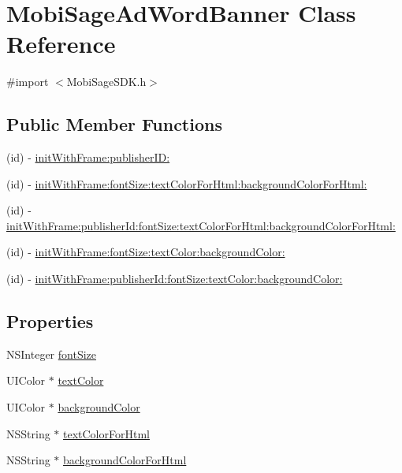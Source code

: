 \hypertarget{interface_mobi_sage_ad_word_banner}{\section{\-Mobi\-Sage\-Ad\-Word\-Banner \-Class \-Reference}
\label{interface_mobi_sage_ad_word_banner}
}


{\ttfamily \#import $<$\-Mobi\-Sage\-S\-D\-K.\-h$>$}

\subsection*{\-Public \-Member \-Functions}
\begin{DoxyCompactItemize}
\item 
(id) -\/ \hyperlink{interface_mobi_sage_ad_word_banner_a49e55ec3dcb56c48d8a99f2b984153e6}{init\-With\-Frame\-:publisher\-I\-D\-:}
\item 
(id) -\/ \hyperlink{interface_mobi_sage_ad_word_banner_afaab2795bb6fdaefda50c5e21671cd46}{init\-With\-Frame\-:font\-Size\-:text\-Color\-For\-Html\-:background\-Color\-For\-Html\-:}
\item 
(id) -\/ \hyperlink{interface_mobi_sage_ad_word_banner_a532c66849dad6dbb172eb224b7fd13fd}{init\-With\-Frame\-:publisher\-Id\-:font\-Size\-:text\-Color\-For\-Html\-:background\-Color\-For\-Html\-:}
\item 
(id) -\/ \hyperlink{interface_mobi_sage_ad_word_banner_a0355594e5b74ef15d67ad687efced19d}{init\-With\-Frame\-:font\-Size\-:text\-Color\-:background\-Color\-:}
\item 
(id) -\/ \hyperlink{interface_mobi_sage_ad_word_banner_a1dfe5a9b73a86f17b23cc8766e8715f7}{init\-With\-Frame\-:publisher\-Id\-:font\-Size\-:text\-Color\-:background\-Color\-:}
\end{DoxyCompactItemize}
\subsection*{\-Properties}
\begin{DoxyCompactItemize}
\item 
\-N\-S\-Integer \hyperlink{interface_mobi_sage_ad_word_banner_a2f16d324535b27651756e3b320cb33e3}{font\-Size}
\item 
\-U\-I\-Color $\ast$ \hyperlink{interface_mobi_sage_ad_word_banner_a79c629991a25f97abf89850d9beb55cd}{text\-Color}
\item 
\-U\-I\-Color $\ast$ \hyperlink{interface_mobi_sage_ad_word_banner_a07d29fdc54b7979f420f29bd853c05c9}{background\-Color}
\item 
\-N\-S\-String $\ast$ \hyperlink{interface_mobi_sage_ad_word_banner_ac11e4aa6d2a4b34def7eb414890331c2}{text\-Color\-For\-Html}
\item 
\-N\-S\-String $\ast$ \hyperlink{interface_mobi_sage_ad_word_banner_a28b237d35f4730fd466a5399e2ac4e5d}{background\-Color\-For\-Html}
\end{DoxyCompactItemize}


